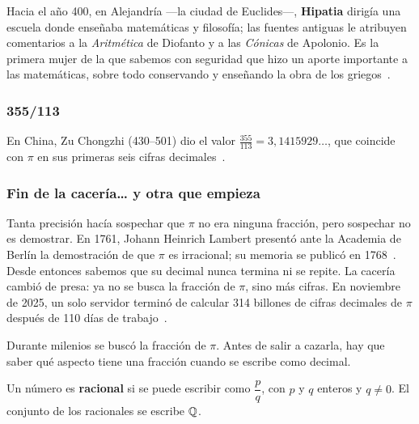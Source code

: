 \documentclass[11pt]{article}
\begin{document}
Hacia el año 400, en Alejandría —la ciudad de Euclides—, \textbf{Hipatia}
dirigía una escuela donde enseñaba matemáticas y filosofía; las fuentes
antiguas le atribuyen comentarios a la \emph{Aritmética} de Diofanto y a las
\emph{Cónicas} de Apolonio. Es la primera mujer de la que sabemos con
seguridad que hizo un aporte importante a las matemáticas, sobre todo
conservando y enseñando la obra de los griegos~\cite{dzielska}.

\subsubsection*{355/113}

En China, Zu Chongzhi (430--501) dio el valor $\frac{355}{113} =
3{,}1415929\ldots$, que coincide con $\pi$ en sus primeras seis cifras
decimales~\cite{mactutorpi}.

\subsubsection*{Fin de la cacería… y otra que empieza}

Tanta precisión hacía sospechar que $\pi$ no era ninguna fracción, pero
sospechar no es demostrar. En 1761, Johann Heinrich Lambert presentó ante la
Academia de Berlín la demostración de que $\pi$ es irracional; su memoria se
publicó en 1768~\cite{lambert}. Desde entonces sabemos que su decimal nunca
termina ni se repite. La cacería cambió de presa: ya no se busca la fracción
de $\pi$, sino más cifras. En noviembre de 2025, un solo servidor terminó de
calcular 314 billones de cifras decimales de $\pi$ después de 110 días de
trabajo~\cite{storagereview}.

\label{tema:racionalesirracionales}

\begin{hilo}
Durante milenios se buscó la fracción de $\pi$. Antes de salir a cazarla,
hay que saber qué aspecto tiene una fracción cuando se escribe como decimal.
\end{hilo}

\begin{definicion}
Un número es \textbf{racional} si se puede escribir como $\dfrac{p}{q}$, con
$p$ y $q$ enteros y $q \neq 0$. El conjunto de los racionales se escribe $\mathbb{Q}$.
\end{definicion}
\end{document}

